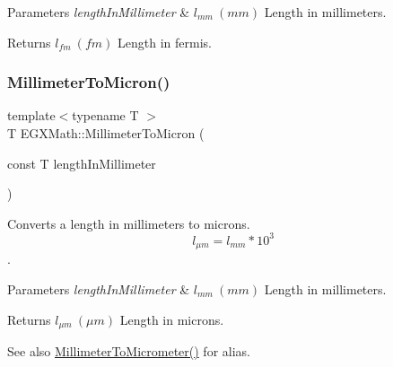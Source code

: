 \begin{DoxyParams}{Parameters}
{\em length\+In\+Millimeter} & $ l_{mm}\ (mm)$ Length in millimeters. \\
\hline
\end{DoxyParams}
\begin{DoxyReturn}{Returns}
$ l_{fm}\ (fm)$ Length in fermis. 
\end{DoxyReturn}
\mbox{\label{group___e_g_x_math-_conversions-_length_conversions-_s_i-_millimeter-_non-_s_i_ga47eac74d2eeec20afc801e61d53f67a0}} 
\subsubsection{\texorpdfstring{Millimeter\+To\+Micron()}{MillimeterToMicron()}}
{\footnotesize\ttfamily template$<$typename T $>$ \\
T E\+G\+X\+Math\+::\+Millimeter\+To\+Micron (\begin{DoxyParamCaption}\item[{const T}]{length\+In\+Millimeter }\end{DoxyParamCaption})}



Converts a length in millimeters to microns. \[ l_{\mu m}=l_{mm} * 10^{3} \]. 


\begin{DoxyParams}{Parameters}
{\em length\+In\+Millimeter} & $ l_{mm}\ (mm)$ Length in millimeters. \\
\hline
\end{DoxyParams}
\begin{DoxyReturn}{Returns}
$ l_{\mu m}\ (\mu m)$ Length in microns. 
\end{DoxyReturn}
\begin{DoxySeeAlso}{See also}
\mbox{\hyperlink{group___e_g_x_math-_conversions-_length_conversions-_s_i-_millimeter-_s_i_gadec5d89ecdd6bfe638f54ceffe0e0630}{Millimeter\+To\+Micrometer()}} for alias. 
\end{DoxySeeAlso}
\mbox{\label{group___e_g_x_math-_conversions-_length_conversions-_s_i-_millimeter-_non-_s_i_ga1f0be98bc702f46a69579b27e05a2439}} 
